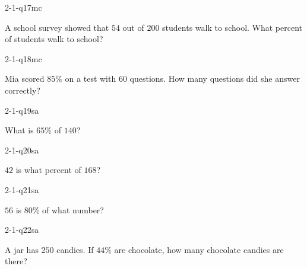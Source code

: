 \begin{practiceQuestion}{2-1-q17}{mc}
\begin{questionText}
A school survey showed that $54$ out of $200$ students walk to school. What percent of students walk to school?
\end{questionText}
\end{practiceQuestion}

\begin{practiceQuestion}{2-1-q18}{mc}
\begin{questionText}
Mia scored $85\%$ on a test with $60$ questions. How many questions did she answer correctly?
\end{questionText}
\end{practiceQuestion}


\begin{practiceQuestion}{2-1-q19}{sa}
\begin{questionText}
What is $65\%$ of $140$?
\end{questionText}
\end{practiceQuestion}

\begin{practiceQuestion}{2-1-q20}{sa}
\begin{questionText}
$42$ is what percent of $168$?
\end{questionText}
\end{practiceQuestion}

\begin{practiceQuestion}{2-1-q21}{sa}
\begin{questionText}
$56$ is $80\%$ of what number?
\end{questionText}
\end{practiceQuestion}

\begin{practiceQuestion}{2-1-q22}{sa}
\begin{questionText}
A jar has $250$ candies. If $44\%$ are chocolate, how many chocolate candies are there?
\end{questionText}
\end{practiceQuestion}


